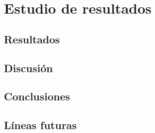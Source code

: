 \chapter{Estudio de resultados}

\section{Resultados}


\section{Discusión}


\section{Conclusiones}


\section{Líneas futuras}

